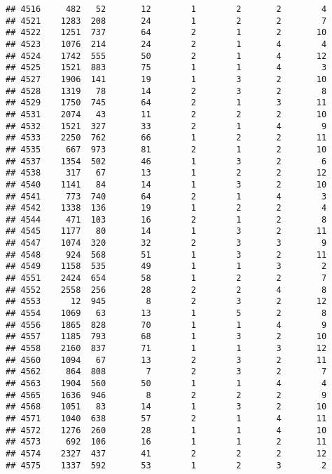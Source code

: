 \documentclass[]{article}
\begin{document}
\begin{verbatim}
## 4516     482   52       12        1        2       2        4
## 4521    1283  208       24        1        2       2        7
## 4522    1251  737       64        2        1       2       10
## 4523    1076  214       24        2        1       4        4
## 4524    1742  555       50        2        1       4       12
## 4525    1521  883       75        1        1       4        3
## 4527    1906  141       19        1        3       2       10
## 4528    1319   78       14        2        3       2        8
## 4529    1750  745       64        2        1       3       11
## 4531    2074   43       11        2        2       2       10
## 4532    1521  327       33        2        1       4        9
## 4533    2250  762       66        1        2       2       11
## 4535     667  973       81        2        1       2       10
## 4537    1354  502       46        1        3       2        6
## 4538     317   67       13        1        2       2       12
## 4540    1141   84       14        1        3       2       10
## 4541     773  740       64        2        1       4        3
## 4542    1338  136       19        1        2       2        4
## 4544     471  103       16        2        1       2        8
## 4545    1177   80       14        1        3       2       11
## 4547    1074  320       32        2        3       3        9
## 4548     924  568       51        1        3       2       11
## 4549    1158  535       49        1        1       3        2
## 4551    2424  654       58        1        2       2        7
## 4552    2558  256       28        2        2       4        8
## 4553      12  945        8        2        3       2       12
## 4554    1069   63       13        1        5       2        8
## 4556    1865  828       70        1        1       4        9
## 4557    1185  793       68        1        3       2       10
## 4558    2160  837       71        1        1       3       12
## 4560    1094   67       13        2        3       2       11
## 4562     864  808        7        2        3       2        7
## 4563    1904  560       50        1        1       4        4
## 4565    1636  946        8        2        2       2        9
## 4568    1051   83       14        1        3       2       10
## 4571    1040  638       57        2        1       4       11
## 4572    1276  260       28        1        1       4       10
## 4573     692  106       16        1        1       2       11
## 4574    2327  437       41        2        2       2       12
## 4575    1337  592       53        1        2       3        2

\end{verbatim}
\end{document}

